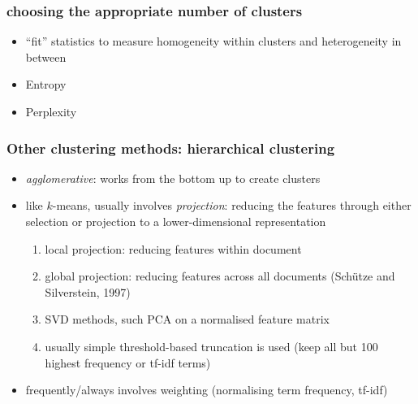 \documentclass{beamer}
\begin{document}
\begin{frame}
	\frametitle{choosing the appropriate number of clusters}
	\begin{itemize}
		\item ``fit'' statistics to measure homogeneity within clusters and
		heterogeneity in between
		\item Entropy
		\item Perplexity
		\end{itemize}
	
\end{frame}

\begin{frame}
	\frametitle{Other clustering methods: hierarchical clustering}
	\begin{itemize}
		\item \emph{agglomerative}: works from the bottom up to create clusters
		\item \pause  like $k$-means, usually involves \emph{projection}: reducing
		the features through either selection or projection to a
		lower-dimensional representation
		\begin{enumerate}
			\item local projection: reducing features within document
			\item global projection: reducing features across all documents (Sch\"utze and Silverstein, 1997)
			\item \pause SVD methods, such PCA on a normalised feature matrix
			\item usually simple threshold-based truncation is used \newline (keep all
			but 100 highest frequency or tf-idf terms)
		\end{enumerate}
		\item \pause frequently/always involves weighting (normalising term
		frequency, tf-idf)
	\end{itemize}
\end{frame}
\end{document}
